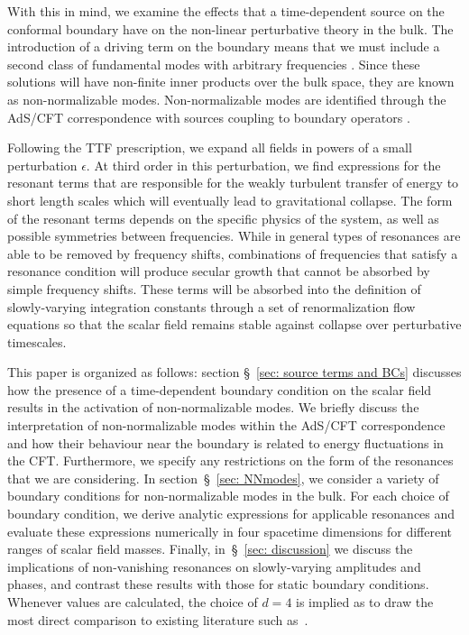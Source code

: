 \documentclass[letterpaper,11pt]{article}
\begin{document}
With this in mind, we examine the effects that a time-dependent source on the conformal boundary have on the non-linear perturbative theory in the bulk. The introduction of a driving term on the boundary means that we must include a second class of fundamental modes with arbitrary frequencies \cite{hep-th/9805171}. Since these solutions will have non-finite inner products over the bulk space, they are known as non-normalizable modes. Non-normalizable modes are identified through the AdS/CFT correspondence with sources coupling to boundary operators \cite{hep-th/9802150, hep-th/9802109}.

Following the TTF prescription, we expand all fields in powers of a small perturbation $\epsilon$. At third order in this perturbation, we find expressions for the resonant terms that are responsible for the weakly turbulent transfer of energy to short length scales which will eventually lead to gravitational collapse. The form of the resonant terms depends on the specific physics of the system, as well as possible symmetries between frequencies. While in general types of resonances are able to be removed by frequency shifts, combinations of frequencies that satisfy a resonance condition will produce secular growth that cannot be absorbed by simple frequency shifts. These terms will be absorbed into the definition of slowly-varying integration constants through a set of renormalization flow equations so that the scalar field remains stable against collapse over perturbative timescales.

This paper is organized as follows: section \S\!~\ref{sec: source terms and BCs} discusses how the presence of a time-dependent boundary condition on the scalar field results in the activation of non-normalizable modes. We briefly discuss the interpretation of non-normalizable modes within the AdS/CFT correspondence and how their behaviour near the boundary is related to energy fluctuations in the CFT. Furthermore, we specify any restrictions on the form of the resonances that we are considering. In section~\S\!~\ref{sec: NNmodes}, we consider a variety of boundary conditions for non-normalizable modes in the bulk. For each choice of boundary condition, we derive analytic expressions for applicable resonances and evaluate these expressions numerically in four spacetime dimensions for different ranges of scalar field masses. Finally, in~\S\!~\ref{sec: discussion} we discuss the implications of non-vanishing resonances on slowly-varying amplitudes and phases, and contrast these results with those for static boundary conditions. Whenever values are calculated, the choice of $d=4$ is implied as to draw the most direct comparison to existing literature such as~\cite{1412.3249, 1407.6273, 1508.04943, 1606.02712}. 
\end{document}
